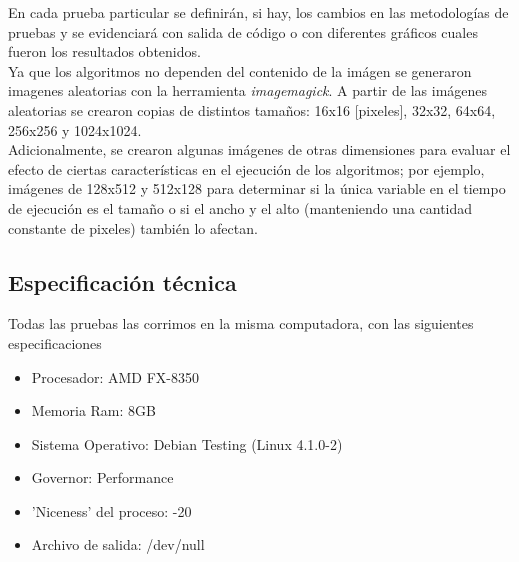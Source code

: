 En cada prueba particular se definir\'an, si hay, los cambios en las metodolog\'ias de pruebas y se evidenciar\'a con salida de c\'odigo o con diferentes gr\'aficos cuales fueron los resultados obtenidos. \\
Ya que los algoritmos no dependen del contenido de la im\'agen se generaron imagenes aleatorias con la herramienta \textit{imagemagick}.
A partir de las im\'agenes aleatorias se crearon copias de distintos tama\~nos: 16x16 [pixeles], 32x32, 64x64, 256x256 y 1024x1024. \\
Adicionalmente, se crearon algunas im\'agenes de otras dimensiones para evaluar el efecto de ciertas caracter\'isticas en el ejecuci\'on de los algoritmos; por ejemplo, im\'agenes de 128x512 y 512x128 para determinar si la \'unica variable en el tiempo de ejecuci\'on es el tama\~no o si el ancho y el alto (manteniendo una cantidad constante de pixeles) tambi\'en lo afectan.

\subsection{Especificaci\'on t\'ecnica}
\label{sec:specs}
Todas las pruebas las corrimos en la misma computadora, con las siguientes especificaciones
\begin{itemize}
\item Procesador: AMD FX-8350
\item Memoria Ram: 8GB
\item Sistema Operativo: Debian Testing (Linux 4.1.0-2)
\item Governor: Performance
\item 'Niceness' del proceso: -20
\item Archivo de salida: /dev/null
\end{itemize}